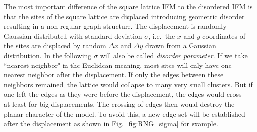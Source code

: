     The most important difference of the square lattice IFM to the
    disordered IFM is that the sites of the square lattice are
    displaced introducing geometric disorder resulting in a non regular graph
    structure.
    The displacement is randomly Gaussian distributed with standard
    deviation \(\sigma\), i.e.~the \(x\) and \(y\) coordinates of the
    sites are displaced by random \(\Delta x\) and \(\Delta y\) drawn
    from a Gaussian distribution.
    In the following \(\sigma\) will also be called \emph{disorder parameter}.
    If we take ``nearest neighbor" in the Euclidean meaning, most sites
    will only have one nearest neighbor after the
    displacement. If only the edges between these neighbors remained,
    the lattice would collapse to many very small clusters. But if one
    left the edges as they were before the displacement, the edges would
    cross -- at least for big displacements. The crossing of edges then
    would destroy the planar character of the model.
    To avoid this, a new edge set will be established after the displacement
    as shown in Fig.~\ref{fig:RNG_sigma} for example.
